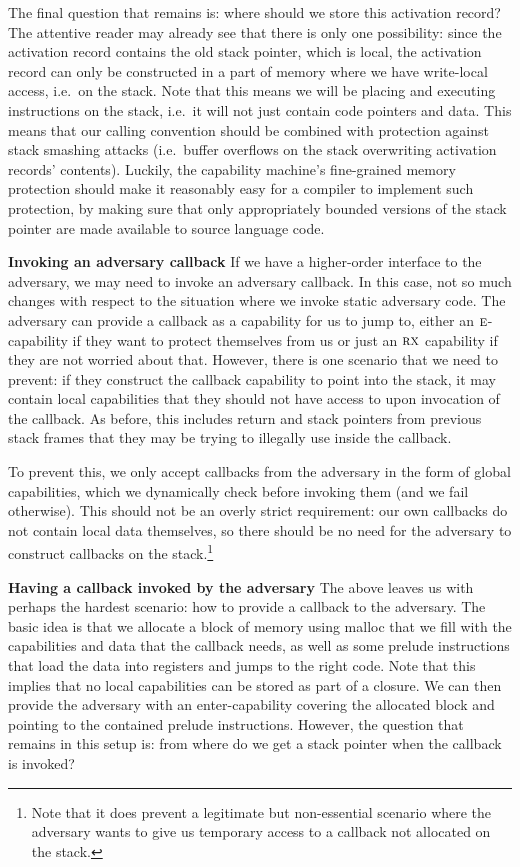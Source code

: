 \documentclass{llncs}
\newcommand{\plainperm}[1]{\textsc{#1}}
\newcommand{\exec}{\plainperm{rx}}
\newcommand{\entry}{\plainperm{e}}
\begin{document}
The final question that remains is: where should we store this activation
record? The attentive reader may already see that there is only one possibility:
since the activation record contains the old stack pointer, which is local, the
activation record can only be constructed in a part of memory where we have
write-local access, i.e.\ on the stack. Note that this means we will be placing
and executing instructions on the stack, i.e.\ it will not just contain code
pointers and data. This means that our calling convention should be combined
with protection against stack smashing attacks (i.e.\ buffer overflows on the
stack overwriting activation records' contents). Luckily, the capability
machine's fine-grained memory protection should make it reasonably easy for a
compiler to implement such protection, by making sure that only appropriately
bounded versions of the stack pointer are made available to source language
code.

\textbf{Invoking an adversary callback} If we have a higher-order interface to
the adversary, we may need to invoke an adversary callback. In this case, not so
much changes with respect to the situation where we invoke static adversary
code. The adversary can provide a callback as a capability for us to jump to,
either an $\entry$-capability if they want to protect themselves from us or just
an $\exec$ capability if they are not worried about that. However, there is one
scenario that we need to prevent: if they construct the callback capability to
point into the stack, it may contain local capabilities that they should not
have access to upon invocation of the callback. As before, this includes return
and stack pointers from previous stack frames that they may be
trying to illegally use inside the callback.

To prevent this, we only accept callbacks from the adversary in the form of
global capabilities, which we dynamically check before invoking them (and we
fail otherwise). This should not be an overly strict requirement: our own
callbacks do not contain local data themselves, so there should be no need for
the adversary to construct callbacks on the stack.\footnote{Note that it does
  prevent a legitimate but non-essential scenario where the adversary wants to
  give us temporary access to a callback not allocated on the stack.}

\textbf{Having a callback invoked by the adversary} The above leaves us with
perhaps the hardest scenario: how to provide a callback to the adversary. The
basic idea is that we allocate a block of memory using malloc that we fill with
the capabilities and data that the callback needs, as well as some
prelude instructions that load the data into registers and jumps to the right
code. Note that this implies that no local capabilities can be stored as part of
a closure. We can then provide the adversary with an enter-capability covering
the allocated block and pointing to the contained prelude instructions. However,
the question that remains in this setup is: from where do we get a stack pointer when
the callback is invoked?
\end{document}
